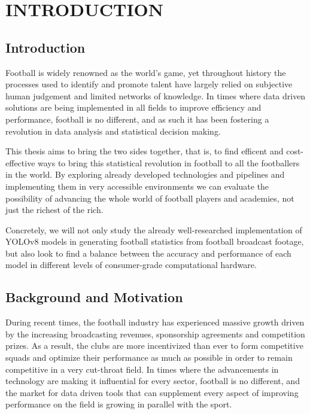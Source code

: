\chapter{INTRODUCTION}
\label{ch:introduction}


\section{Introduction}

Football is widely renowned as the world’s game, yet throughout history the processes used to identify and promote talent have largely relied on subjective human judgement and limited networks of knowledge. In times where data driven solutions are being implemented in all fields to improve efficiency and performance, football is no different, and as such it has been fostering a revolution in data analysis and statistical decision making. 

This thesis aims to bring the two sides together, that is, to find efficent and cost-effective ways to bring this statistical revolution in football to all the footballers in the world. By exploring already developed technologies and pipelines and implementing them in very accessible environments we can evaluate the possibility of advancing the whole world of football players and academies, not just the richest of the rich. 

Concretely, we will not only study the already well-researched implementation of YOLOv8 models in generating football statistics from football broadcast footage, but also look to find a balance between the accuracy and performance of each model in different levels of consumer-grade computational hardware.



\section{Background and Motivation}

During recent times, the football industry has experienced massive growth driven by the increasing broadcasting revenues, sponsorship agreements and competition prizes. As a result, the clubs are more incentivized than ever to form competitive squads and optimize their performance as much as possible in order to remain competitive in a very cut-throat field. In times where the advancements in technology are making it influential for every sector, football is no different, and the market for data driven tools that can supplement every aspect of improving performance on the field is growing in parallel with the sport.

